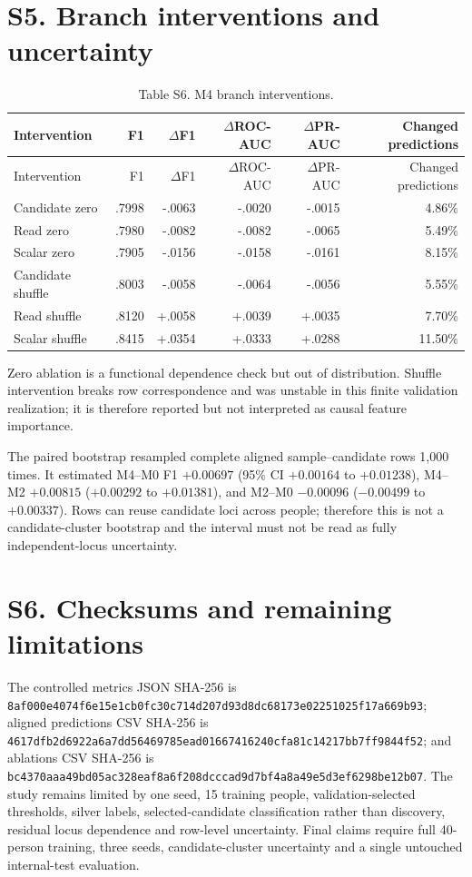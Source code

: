 \documentclass[10pt]{article}
\begin{document}
\section*{S5. Branch interventions and uncertainty}
\begin{longtable}{lrrrrr}
\caption{Table S6. M4 branch interventions.}\label{tab:s6ablations}\\
\toprule Intervention & F1 & $\Delta$F1 & $\Delta$ROC-AUC & $\Delta$PR-AUC & Changed predictions\\\midrule\endfirsthead
\toprule Intervention & F1 & $\Delta$F1 & $\Delta$ROC-AUC & $\Delta$PR-AUC & Changed predictions\\\midrule\endhead
\bottomrule\endfoot
Candidate zero & .7998 & -.0063 & -.0020 & -.0015 & 4.86\%\\
Read zero & .7980 & -.0082 & -.0082 & -.0065 & 5.49\%\\
Scalar zero & .7905 & -.0156 & -.0158 & -.0161 & 8.15\%\\
Candidate shuffle & .8003 & -.0058 & -.0064 & -.0056 & 5.55\%\\
Read shuffle & .8120 & +.0058 & +.0039 & +.0035 & 7.70\%\\
Scalar shuffle & .8415 & +.0354 & +.0333 & +.0288 & 11.50\%\\
\end{longtable}
Zero ablation is a functional dependence check but out of distribution. Shuffle intervention breaks row correspondence and was unstable in this finite validation realization; it is therefore reported but not interpreted as causal feature importance.

The paired bootstrap resampled complete aligned sample--candidate rows 1,000 times. It estimated M4--M0 F1 $+0.00697$ (95\% CI $+0.00164$ to $+0.01238$), M4--M2 $+0.00815$ ($+0.00292$ to $+0.01381$), and M2--M0 $-0.00096$ ($-0.00499$ to $+0.00337$). Rows can reuse candidate loci across people; therefore this is not a candidate-cluster bootstrap and the interval must not be read as fully independent-locus uncertainty.

\section*{S6. Checksums and remaining limitations}
The controlled metrics JSON SHA-256 is \texttt{8af000e4074f6e15e1cb0fc30c714d207d93d8dc68173e02251025f17a669b93}; aligned predictions CSV SHA-256 is \texttt{4617dfb2d6922a6a7dd56469785ead01667416240cfa81c14217bb7ff9844f52}; and ablations CSV SHA-256 is \texttt{bc4370aaa49bd05ac328eaf8a6f208dcccad9d7bf4a8a49e5d3ef6298be12b07}. The study remains limited by one seed, 15 training people, validation-selected thresholds, silver labels, selected-candidate classification rather than discovery, residual locus dependence and row-level uncertainty. Final claims require full 40-person training, three seeds, candidate-cluster uncertainty and a single untouched internal-test evaluation.
\end{document}
